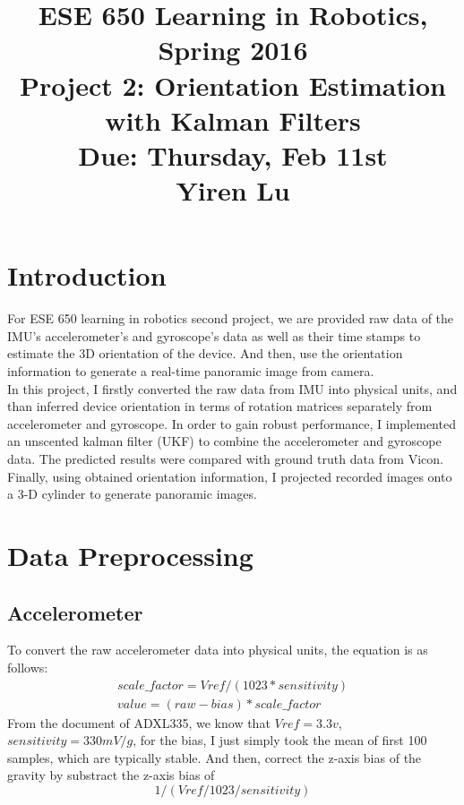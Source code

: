 \documentclass[english]{article}
\title{ESE 650 Learning in Robotics, Spring 2016 \\ Project 2: Orientation Estimation with Kalman Filters\\
Due: Thursday, Feb 11st \\ Yiren Lu}
\date{}
\begin{document}
\maketitle
\vspace{-30pt}

\section*{Introduction}

For ESE 650 learning in robotics second project, we are provided raw data of the IMU's accelerometer's and gyroscope's data as well as their time stamps to estimate the 3D orientation of the device. And then, use the orientation information to generate a real-time panoramic image from camera. \\
In this project, I firstly converted the raw data from IMU into physical units, and than inferred device orientation in terms of rotation matrices separately from accelerometer and gyroscope. In order to gain robust performance, I implemented an unscented kalman filter (UKF) to combine the accelerometer and gyroscope data. The predicted results were compared with ground truth data from Vicon. Finally, using obtained orientation information, I projected recorded images onto a 3-D cylinder to generate panoramic images. \\




\section {Data Preprocessing}
\subsection {Accelerometer} 
To convert the raw accelerometer data into physical units, the equation is as follows:
\begin{align}
scale\_factor = Vref/(1023 * sensitivity) \\
value = (raw - bias) * scale\_factor 
\end{align}
From the document of ADXL335, we know that $Vref = 3.3v$, $sensitivity = 330 mV/g$,  for the bias, I just simply took the mean of first 100 samples, which are typically stable. And then, correct the z-axis bias of the gravity by substract the z-axis bias of
\begin{equation}
1/ (Vref / 1023 / sensitivity) 
\end{equation}
\end{document}
